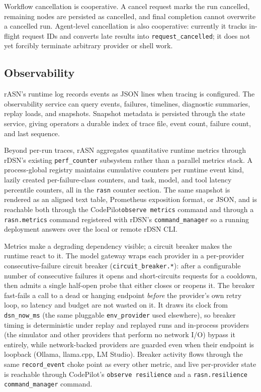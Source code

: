 \documentclass[manuscript,screen,review]{acmart}
\newcommand{\rasn}{rASN\xspace}
\newcommand{\rdsn}{rDSN\xspace}
\newcommand{\codepilot}{CodePilot\xspace}
\begin{document}
Workflow cancellation is cooperative. A cancel request marks the run cancelled,
remaining nodes are persisted as cancelled, and final completion cannot
overwrite a cancelled run. Agent-level cancellation is also cooperative:
currently it tracks in-flight request IDs and converts late results into
\texttt{request\_cancelled}; it does not yet forcibly terminate arbitrary
provider or shell work.

\subsection{Observability}

\rasn's runtime log records events as JSON lines when tracing is configured.
The observability service can query events, failures, timelines, diagnostic
summaries, replay loads, and snapshots. Snapshot metadata is persisted through
the state service, giving operators a durable index of trace file, event count,
failure count, and last sequence.

Beyond per-run traces, \rasn aggregates quantitative runtime metrics through
\rdsn's existing \texttt{perf\_counter} subsystem rather than a parallel metrics
stack. A process-global registry maintains cumulative counters per runtime event
kind, lazily created per-failure-class counters, and task, model, and tool
latency percentile counters, all in the \texttt{rasn} counter section. The same
snapshot is rendered as an aligned text table, Prometheus exposition format, or
JSON, and is reachable both through the \codepilot \texttt{observe metrics}
command and through a \texttt{rasn.metrics} command registered with \rdsn's
\texttt{command\_manager} so a running deployment answers over the local or
remote \rdsn CLI.

Metrics make a degrading dependency visible; a circuit breaker makes the runtime
react to it. The model gateway wraps each provider in a per-provider
consecutive-failure circuit breaker (\texttt{circuit\_breaker.*}): after a
configurable number of consecutive failures it opens and short-circuits requests
for a cooldown, then admits a single half-open probe that either closes or
reopens it. The breaker fast-fails a call to a dead or hanging endpoint
\emph{before} the provider's own retry loop, so latency and budget are not wasted
on it. It draws its clock from \texttt{dsn\_now\_ms} (the same pluggable
\texttt{env\_provider} used elsewhere), so breaker timing is deterministic under
replay and replayed runs and in-process providers (the simulator and other
providers that perform no network I/O) bypass it entirely, while network-backed
providers are guarded even when their endpoint is loopback (Ollama, llama.cpp, LM
Studio).
Breaker activity flows through the same \texttt{record\_event} choke point as
every other metric, and live per-provider state is reachable through \codepilot's
\texttt{observe resilience} and a \texttt{rasn.resilience} \texttt{command\_manager}
command.
\end{document}
